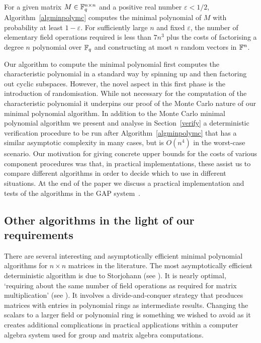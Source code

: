 \begin{Theo}\label{main}
For a given matrix $M \in \mathbb{F}_q^{n \times n}$ and a positive 
real number $\varepsilon < 1/2$, Algorithm~\ref{algminpolymc}
computes the minimal polynomial of $M$ with probability at least $1-\varepsilon$.
For sufficiently large $n$ and fixed $\varepsilon$, the number of elementary 
field operations required is less than $7n^3$ plus the costs of 
factorising a degree $n$ polynomial over\/ $\mathbb{F}_q$ and constructing at most $n$
random vectors in\/ $\mathbb{F}^n$.
\end{Theo}


Our algorithm to compute the minimal polynomial first computes the
characteristic polynomial in a standard way by spinning up and then
factoring out cyclic
subspaces. However, the novel aspect in this first phase
is the introduction of randomisation. While
not necessary for the computation of the characteristic polynomial
it underpins our proof of the Monte Carlo 
nature of our minimal polynomial algorithm. In addition to the Monte Carlo
minimal polynomial algorithm
we present and analyse in Section~\ref{verify} a deterministic
verification procedure to
%
be run after Algorithm~\ref{algminpolymc} that has a similar asymptotic
complexity in many cases, but is $O(n^4)$ in the worst-case scenario.
Our motivation for giving concrete upper bounds for the costs of 
various component procedures was that, in practical implementations, 
these assist us to compare different algorithms in order to 
decide which to use in different situations. At the end of the paper we discuss
a practical implementation and tests of the algorithms in the {\sf GAP}
system~\cite{GAP4}.

\subsection{Other algorithms in the light of our requirements}

There are several interesting and asymptotically efficient
minimal polynomial algorithms for $n\times n$ matrices in the literature. The most  
asymptotically efficient deterministic algorithm is due to Storjohann 
(see \cite{Stor01}). It is nearly optimal, `requiring about the same number of 
field operations as required for matrix 
multiplication' (see \cite[Abstract, p368]{Stor01}). 
It involves a divide-and-conquer strategy that produces matrices 
with entries in polynomial rings as intermediate results. 
Changing the scalars to a larger field or polynomial ring is 
something we wished to avoid as it creates additional complications in practical 
applications within a computer algebra system used for group and 
matrix algebra computations.

